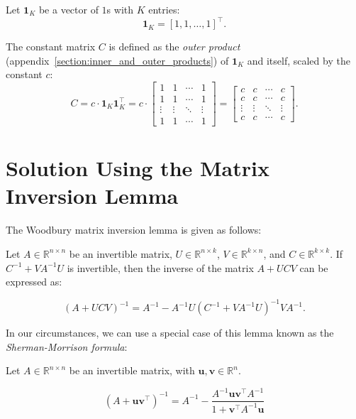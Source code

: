 \documentclass[twoside]{article}
\begin{document}
Let $\boldsymbol{1}_K$ be a vector of $1$s with $K$ entries:
\[
    \boldsymbol{1}_K = [1, 1, \dots, 1]^\top.
\]

The constant matrix $C$ is defined as the \textit{outer product} (appendix~\ref{section:inner_and_outer_products}) of $\boldsymbol{1}_K$ and itself, scaled by the constant $c$:
\[
    C = c \cdot \boldsymbol{1}_K \boldsymbol{1}_K^\top =
    c \cdot \begin{bmatrix}
        1 & 1 & \cdots & 1 \\
        1 & 1 & \cdots & 1 \\
        \vdots & \vdots & \ddots & \vdots \\
        1 & 1 & \cdots & 1
    \end{bmatrix} =
    \begin{bmatrix}
        c & c & \cdots & c \\
        c & c & \cdots & c \\
        \vdots & \vdots & \ddots & \vdots \\
        c & c & \cdots & c
    \end{bmatrix}.
\]

\section{Solution Using the Matrix Inversion Lemma}

The Woodbury matrix inversion lemma\cite{woodbury} is given as follows:

Let $A \in \mathbb{R}^{n \times n}$ be an invertible matrix, $U \in \mathbb{R}^{n \times k}$, $V \in \mathbb{R}^{k \times n}$, and $C \in \mathbb{R}^{k \times k}$. If $C^{-1} + VA^{-1}U$ is invertible, then the inverse of the matrix $A + UCV$ can be expressed as:

\[
    (A + UCV)^{-1} = A^{-1} - A^{-1}U(C^{-1} + VA^{-1}U)^{-1}VA^{-1}.
\]

In our circumstances, we can use a special case of this lemma known as the \textit{Sherman-Morrison formula}\cite{sherman}:

Let $A \in \mathbb{R}^{n \times n}$ be an invertible matrix, with $\boldsymbol{u}, \boldsymbol{v} \in \mathbb{R}^n$.

\begin{equation}
\label{eq:sherman}
\left(A + \boldsymbol{u} \boldsymbol{v}^\top\right)^{-1} = A^{-1} - \frac{A^{-1}\boldsymbol{u}\boldsymbol{v}^{\top}A^{-1}}{1 + \boldsymbol{v}^{\top}A^{-1}\boldsymbol{u} }
\end{equation}
\end{document}
